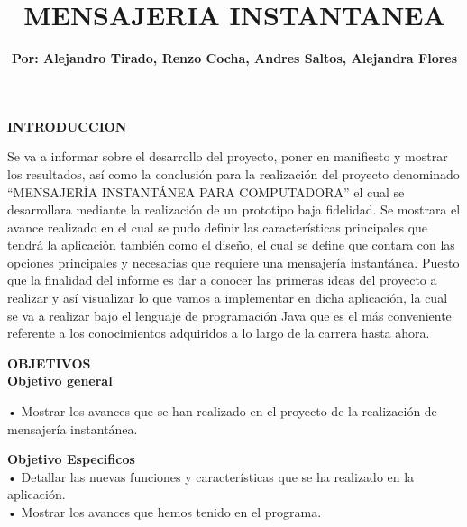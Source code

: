 \documentclass[11pt,a4paper]{report}
\author{\textbf{Por: Alejandro Tirado, Renzo Cocha, Andres Saltos, Alejandra Flores}}
\title{\textbf{MENSAJERIA INSTANTANEA}}
\date{}
\begin{document}
\maketitle
\begin{center}
\large \textbf{INTRODUCCION}
\end{center}
Se va a informar sobre el desarrollo del proyecto, poner en manifiesto y mostrar los\vspace{0,5cm} resultados, así como la conclusión para la realización del proyecto denominado\vspace{0,5cm} “MENSAJERÍA INSTANTÁNEA PARA COMPUTADORA” el cual se desarrollara mediante la realización\vspace{0,5cm} de un prototipo baja fidelidad.
Se mostrara el avance realizado en el cual\vspace{0,5cm} se pudo definir las características principales que tendrá la aplicación también como el\vspace{0,5cm} diseño, el cual se define que contara con las opciones principales y necesarias que requiere\vspace{0,5cm} una mensajería instantánea.
Puesto que la finalidad del informe es dar a conocer las\vspace{0,5cm} primeras ideas del proyecto a realizar y así visualizar lo que vamos a implementar en dicha\vspace{0,5cm} aplicación, la cual se va a realizar bajo el lenguaje de programación Java que es el más\vspace{0,5cm} conveniente referente a los conocimientos adquiridos a lo largo de la carrera hasta ahora.\newpage

\textbf{OBJETIVOS}\newline\\

\textbf{Objetivo general}\vspace{0,5cm}

• Mostrar los avances que se han realizado en el proyecto de la realización de mensajería instantánea. \vspace{0,5cm}

\textbf{Objetivo Especificos}\newline\\


•	Detallar  las nuevas funciones y características que se ha realizado en la aplicación.\newline\\

•	Mostrar los avances que hemos tenido en el programa. \newline\\
\end{document}
